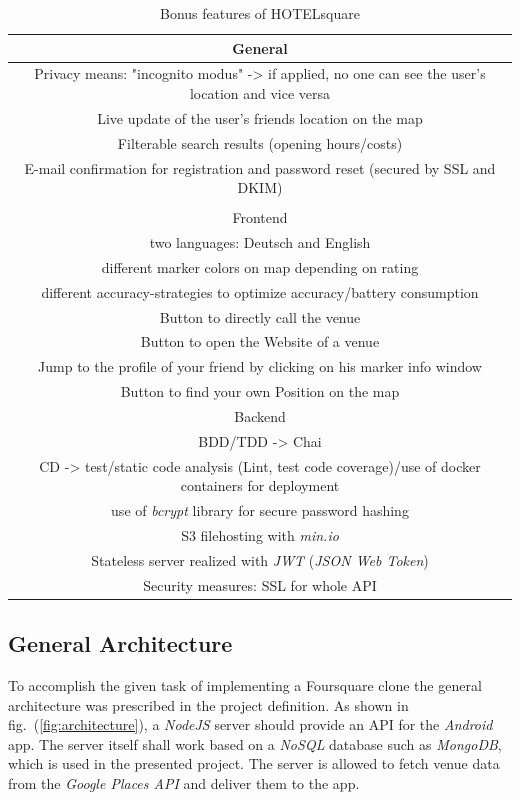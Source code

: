\begin{table}[htbp]
	\centering
	\label{tab:bonus_features}
	\begin{tabular}{c}
		General \\
		\hline\hline
		Privacy means: "incognito modus" 
		-> if applied, no one can see the user's location and vice versa \\
		\hline
		Live update of the user's friends location on the map \\
		\hline
		Filterable search results (opening hours/costs) \\
		\hline
		E-mail confirmation for registration and password reset (secured by SSL and DKIM) \\
		\hline
		\\
		\hline\hline
		Frontend \\
		\hline\hline
		two languages: Deutsch and English  \\
		\hline
		different marker colors on map depending on rating \\
		\hline
		different accuracy-strategies to optimize accuracy/battery consumption \\
		\hline
		Button to directly call the venue \\
		\hline
		Button to open the Website of a venue \\
		\hline
		Jump to the profile of your friend by clicking on his marker info window \\
		\hline
		Button to find your own Position on the map \\
		\hline\hline
		Backend \\
		\hline\hline
		BDD/TDD -> Chai \\
		\hline
		CD -> test/static code analysis (Lint, test code coverage)/use of docker containers for deployment \\
		\hline
		use of \textit{bcrypt} library for secure password hashing \\
		\hline
		S3 filehosting with \textit{min.io} \\
		\hline
		Stateless server realized with \textit{JWT} (\textit{JSON Web Token}) \\
		\hline
		Security measures: SSL for whole API \\
	\end{tabular}
\caption{Bonus features of HOTELsquare}
\end{table}



\subsection{General Architecture}
\label{subsec:general_architecture}
To accomplish the given task of implementing a Foursquare clone the general architecture was prescribed in the project definition. As shown in fig.\ (\ref{fig:architecture}), a \textit{NodeJS} server should provide an API for the \textit{Android} app. The server itself shall work based on a \textit{NoSQL} database such as \textit{MongoDB}, which is used in the presented project. The server is allowed to fetch venue data from the \textit{Google Places API} and deliver them to the app. 

